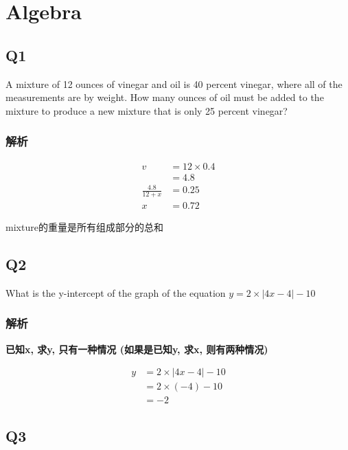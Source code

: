 \chapter{Algebra}

\section{Q1}

  A mixture of 12 ounces of vinegar and oil is 40 percent vinegar, where all
  of the measurements are by weight. How many ounces of oil must be added to
  the mixture to produce a new mixture that is only 25 percent vinegar?

  \subsection{解析}

    \begin{align*}
      v &= 12 \times 0.4 \\
      &= 4.8 \\
      \frac{4.8}{12 + x} &= 0.25 \\
      x &= 0.72
    \end{align*}

    mixture的重量是所有组成部分的总和

\section{Q2}

  What is the y-intercept of the graph of the equation
  $ y = 2 \times \left| 4x − 4 \right| − 10 $

  \subsection{解析}

    \textbf{已知x, 求y, 只有一种情况 (如果是已知y, 求x, 则有两种情况)}

    \begin{align*}
      y &= 2 \times \left| 4x − 4 \right| − 10 \\
      &= 2 \times \left( -4 \right) - 10 \\
      &= -2
    \end{align*}

\section{Q3}

